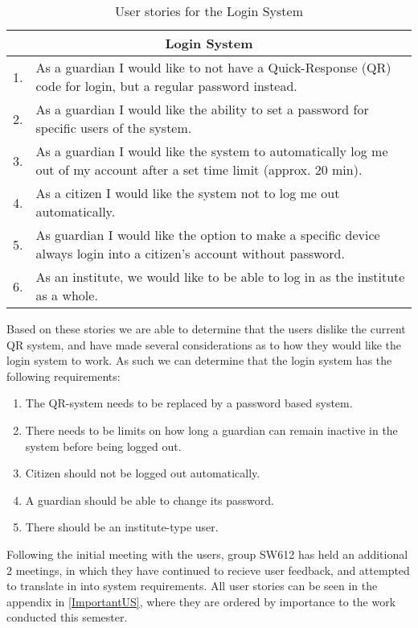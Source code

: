 \begin{table}[H]
\begin{tabular}{|c|p{12.5cm}|}
\hline 
\multicolumn{2}{|c|}{Login System}\\ \hline 
1. & As a guardian I would like to not have a Quick-Response (QR) code for
login, but a regular password instead.\\ \hline 
2. & As a guardian I would like the ability to set a password for specific users
of the system.\\ \hline
3. & As a guardian I would like the system to automatically log me out of my
account after a set time limit (approx. 20 min).\\ \hline
4. & As a citizen I would like the system not to log me out automatically.\\ \hline
5. & As guardian I would like the option to make a specific device always login
into a citizen's account without password.\\ \hline
6. & As an institute, we would like to be able to log in as the institute as a
whole.\\\hline
\end{tabular}
\caption{User stories for the Login System}
\label{UserStoriesLogin}
\end{table}
 
Based on these stories we are able to determine that the users dislike the
current QR system, and have made several considerations as to how they would
like the login system to work. As such we can determine that the login system
has the following requirements:

 \begin{enumerate}
   \item The QR-system needs to be replaced by a password based system.
   \item There needs to be limits on how long a guardian can remain inactive in
   the system before being logged out. 
   \item Citizen should not be logged out automatically. 
   \item A guardian should be able to change its password.
   \item There should be an institute-type user.
 \end{enumerate}%

Following the initial meeting with the users, group SW612 has held an additional
2 meetings, in which they have continued to recieve user feedback, and attempted
to translate in into system requirements. All user stories can be seen in the
appendix in \autoref{ImportantUS}, where they are ordered by importance to the
work conducted this semester.













